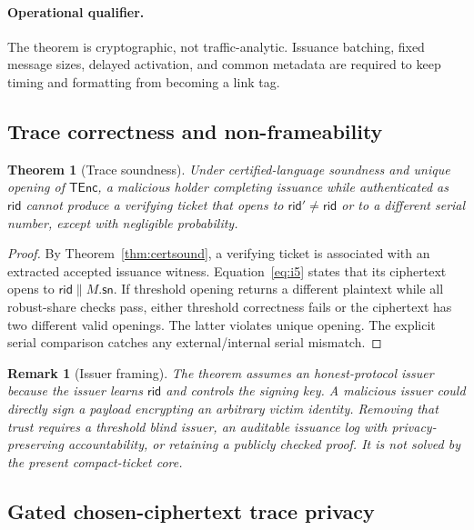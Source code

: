 \documentclass[11pt]{article}
\newtheorem{theorem}[definition]{Theorem}
\newtheorem{remark}[definition]{Remark}
\newcommand{\TEnc}{\mathsf{TEnc}}
\newcommand{\rid}{\mathsf{rid}}
\newcommand{\sn}{\mathsf{sn}}
\begin{document}
\paragraph{Operational qualifier.}
The theorem is cryptographic, not traffic-analytic.  Issuance batching, fixed
message sizes, delayed activation, and common metadata are required to keep
timing and formatting from becoming a link tag.

\subsection{Trace correctness and non-frameability}

\begin{theorem}[Trace soundness]\label{thm:trace}
Under certified-language soundness and unique opening of $\TEnc$, a malicious
holder completing issuance while authenticated as $\rid$ cannot produce a
verifying ticket that opens to $\rid'\neq\rid$ or to a different serial number,
except with negligible probability.
\end{theorem}

\begin{proof}
By Theorem~\ref{thm:certsound}, a verifying ticket is associated with an
extracted accepted issuance witness.  Equation~\eqref{eq:i5} states that its
ciphertext opens to $\rid\|M.\sn$.  If threshold opening returns a different
plaintext while all robust-share checks pass, either threshold correctness
fails or the ciphertext has two different valid openings.  The latter violates
unique opening.  The explicit serial comparison catches any external/internal
serial mismatch.
\end{proof}

\begin{remark}[Issuer framing]
The theorem assumes an honest-protocol issuer because the issuer learns $\rid$
and controls the signing key.  A malicious issuer could directly sign a payload
encrypting an arbitrary victim identity.  Removing that trust requires a
threshold blind issuer, an auditable issuance log with privacy-preserving
accountability, or retaining a publicly checked proof.  It is not solved by the
present compact-ticket core.
\end{remark}

\subsection{Gated chosen-ciphertext trace privacy}
\end{document}
